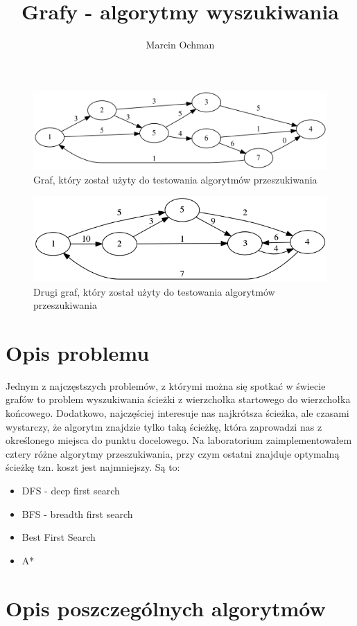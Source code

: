\documentclass[10pt,a4paper]{article}
\author{Marcin Ochman}
\title{Grafy - algorytmy wyszukiwania}
\begin{document}
\maketitle

\begin{figure}[H]
\centering
\includegraphics[width=0.7\linewidth]{./Wykresy/graf1}
\caption{Graf, który został użyty do testowania algorytmów przeszukiwania}
\label{fig:graf}
\end{figure}

\begin{figure}[H]
\centering
\includegraphics[width=0.7\linewidth]{./Wykresy/graf2}
\caption{Drugi graf, który został użyty do testowania algorytmów przeszukiwania}
\label{fig:graf}
\end{figure}

\section{Opis problemu}
Jednym z najczęstszych problemów, z którymi można się spotkać w
świecie grafów to problem wyszukiwania ścieżki z wierzchołka 
startowego do wierzchołka końcowego. Dodatkowo,
najczęściej interesuje nas najkrótsza ścieżka, ale czasami 
wystarczy, że algorytm znajdzie tylko taką ścieżkę, która zaprowadzi
nas z określonego miejsca do punktu docelowego. Na laboratorium
zaimplementowałem cztery różne algorytmy przeszukiwania, przy czym
ostatni znajduje optymalną ścieżkę tzn. koszt jest najmniejszy.
Są to:
\begin{itemize}
\item DFS - deep first search
\item BFS - breadth first search
\item Best First Search
\item A*
\end{itemize}

\section{Opis poszczególnych algorytmów}
\end{document}
